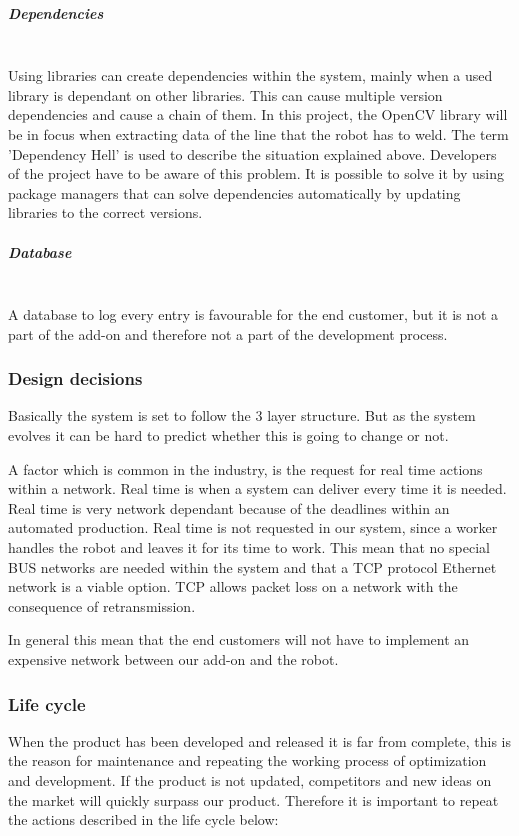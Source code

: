\subparagraph*{Dependencies}~\\
Using libraries can create dependencies within the system, mainly when a used library is dependant on other libraries. This can cause multiple version dependencies and cause a chain of them. In this project, the OpenCV library will be in focus when extracting data of the line that the robot has to weld. The term 'Dependency Hell' is used to describe the situation explained above. Developers of the project have to be aware of this problem. It is possible to solve it by using package managers that can solve dependencies automatically by updating libraries to the correct versions. 

\subparagraph*{Database}~\\
A database to log every entry is favourable for the end customer, but it is not a part of the add-on and therefore not a part of the development process.

\subsubsection{Design decisions}
Basically the system is set to follow the 3 layer structure. But as the system evolves it can be hard to predict whether this is going to change or not. 

A factor which is common in the industry, is the request for real time actions within a network. Real time is when a system can deliver every time it is needed. Real time is very network dependant because of the deadlines within an automated production. 
Real time is not requested in our system, since a worker handles the robot and leaves it for its time to work. This mean that no special BUS networks are needed within the system and that a TCP protocol Ethernet network is a viable option. TCP allows packet loss on a network with the consequence of retransmission.

In general this mean that the end customers will not have to implement an expensive network between our add-on and the robot. 

\subsubsection{Life cycle}

When the product has been developed and released it is far from complete, this is the reason for maintenance and repeating the working process of optimization and development. If the product is not updated, competitors and new ideas on the market will quickly surpass our product. Therefore it is important to repeat the actions described in the life cycle below:
\clearpage

